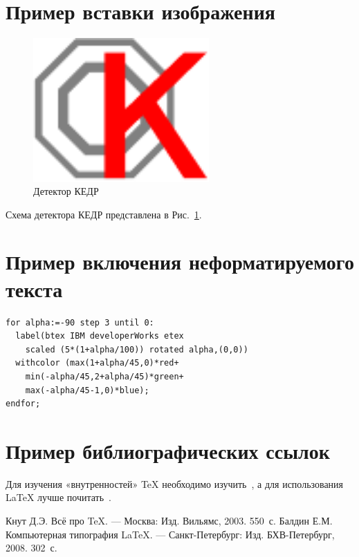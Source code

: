 \documentclass[12pt,a4paper]{scrartcl}
\begin{document}
\section{Пример вставки изображения}
\label{sec:picexample}
\begin{figure}[htbp]
  \centering
  \includegraphics[width=0.6\textwidth]{KEDR}
  \caption{Детектор КЕДР}\label{fig:KEDR}
\end{figure}

Схема детектора КЕДР представлена в Рис.~\ref{fig:KEDR}.


\section{Пример включения неформатируемого текста}

\begin{verbatim}
for alpha:=-90 step 3 until 0:
  label(btex IBM developerWorks etex
    scaled (5*(1+alpha/100)) rotated alpha,(0,0))
  withcolor (max(1+alpha/45,0)*red+
    min(-alpha/45,2+alpha/45)*green+
    max(-alpha/45-1,0)*blue);
endfor;
\end{verbatim}


\section{Пример библиографических ссылок}

Для изучения «внутренностей» \TeX{} необходимо 
изучить~\cite{Knuth-2003}, а для использования \LaTeX{} лучше
почитать~\cite{Baldin-2008}.

\begin{thebibliography}{9}
Кнут Д.Э. Всё про \TeX. \newblock --- Москва:
Изд. Вильямс, 2003. 550~с.
Балдин Е.М. Компьютерная типография
\LaTeX. \newblock --- Санкт-Петербург: Изд. БХВ-Петербург,
2008. 302~с.
\end{thebibliography}
\end{document}
